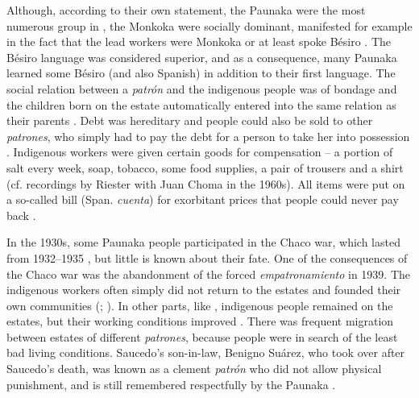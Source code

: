 Although, according to their own statement, the Paunaka were the most numerous group in , the Monkoka were socially dominant, manifested for example in the fact that the lead workers were Monkoka or at least spoke Bésiro \citep[2]{Villalta2013}. The Bésiro language was considered superior, and as a consequence, many Paunaka learned some Bésiro (and also Spanish) in addition to their first language. 
The social relation between a \textit{patrón} and the indigenous people was of bondage and the children born on the estate automatically entered into the same relation as their parents \citep[4]{Villalta2013}.
Debt was hereditary and people could also be sold to other \textit{patrones}, who simply had to pay the debt for a person to take her into possession \citep[228]{Tonelli2004}. 
Indigenous workers were given certain goods for compensation – a portion of salt every week, soap, tobacco, some food supplies, a pair of trousers and a shirt (cf. recordings by Riester with Juan Choma in the 1960s). All items were put on a so-called bill (Span. \textit{cuenta}) for exorbitant prices that people could never pay back \citep[cf. also][261]{Tonelli2004}.
 
In the 1930s, some Paunaka people participated in the Chaco war, which lasted from 1932–1935 \citep[13]{Villalta2012}, but little is known about their fate.
One of the consequences of the Chaco war was the abandonment of the forced \textit{em\-pa\-tro\-na\-mien\-to} in 1939. The indigenous workers often simply did not return to the estates and founded their own communities (\citealt[61--62]{APCOB_Saberes}; \citealt[293--294]{Tonelli2004}). In other parts, like , indigenous people remained on the estates, but their working conditions improved \citep[294]{Tonelli2004}. There was frequent migration between estates of different \textit{patrones}, because people were in search of the least bad living conditions. Saucedo’s son-in-law, Benigno Suárez, who took over  after Saucedo's death, was known as a clement \textit{patrón} who did not allow physical punishment, and is still remembered respectfully by the Paunaka \citep[4]{Villalta2013}.

